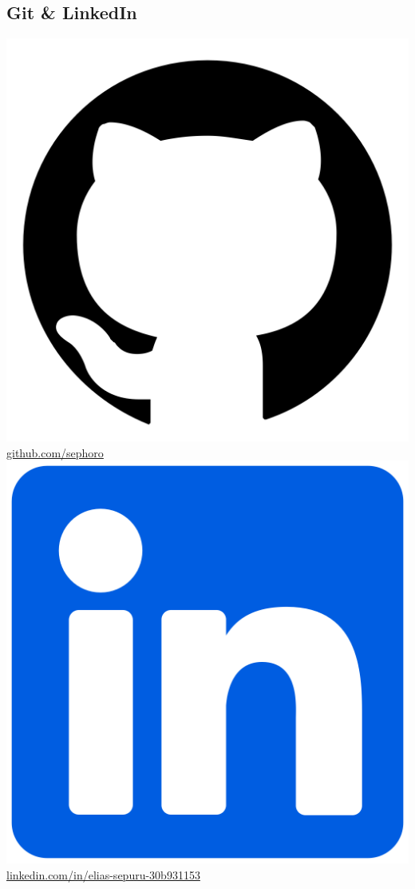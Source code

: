 \documentclass[]{friggeri-cv}
\begin{document}
\begin{aside}
  \section{Git \& LinkedIn}
  \includegraphics[scale=0.025]{img/git.png}  \href{https://github.com/sephoro}{github.com/sephoro}
  \vspace{0.5cm} 
  \includegraphics[scale=0.023]{img/linked2.png}
    \href{https://www.linkedin.com/in/elias-sepuru-30b931153/}{linkedin.com/in/elias-sepuru-30b931153}
    ~
  

\end{aside}
\end{document}
